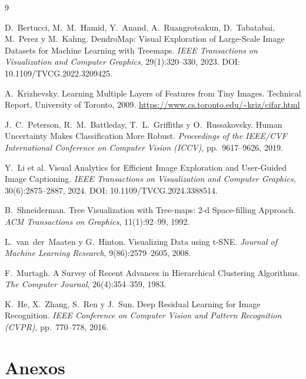 \documentclass[11pt,a4paper]{article}
\begin{document}
\begin{thebibliography}{9}

D.~Bertucci, M.~M.~Hamid, Y.~Anand, A.~Ruangrotsakun, D.~Tabatabai, M.~Perez y
M.~Kahng.
\newblock DendroMap: Visual Exploration of Large-Scale Image Datasets for
Machine Learning with Treemaps.
\newblock \emph{IEEE Transactions on Visualization and Computer Graphics},
29(1):320--330, 2023. DOI: 10.1109/TVCG.2022.3209425.

A.~Krizhevsky.
\newblock Learning Multiple Layers of Features from Tiny Images.
\newblock Technical Report, University of Toronto, 2009.
\newblock \url{https://www.cs.toronto.edu/~kriz/cifar.html}

J.~C.~Peterson, R.~M.~Battleday, T.~L.~Griffiths y O.~Russakovsky.
\newblock Human Uncertainty Makes Classification More Robust.
\newblock \emph{Proceedings of the IEEE/CVF International Conference on Computer
Vision (ICCV)}, pp.~9617--9626, 2019.

Y.~Li et al.
\newblock Visual Analytics for Efficient Image Exploration and User-Guided Image
Captioning.
\newblock \emph{IEEE Transactions on Visualization and Computer Graphics},
30(6):2875--2887, 2024. DOI: 10.1109/TVCG.2024.3388514.

B.~Shneiderman.
\newblock Tree Visualization with Tree-maps: 2-d Space-filling Approach.
\newblock \emph{ACM Transactions on Graphics}, 11(1):92--99, 1992.

L.~van~der~Maaten y G.~Hinton.
\newblock Visualizing Data using t-SNE.
\newblock \emph{Journal of Machine Learning Research}, 9(86):2579--2605, 2008.

F.~Murtagh.
\newblock A Survey of Recent Advances in Hierarchical Clustering Algorithms.
\newblock \emph{The Computer Journal}, 26(4):354--359, 1983.

K.~He, X.~Zhang, S.~Ren y J.~Sun.
\newblock Deep Residual Learning for Image Recognition.
\newblock \emph{IEEE Conference on Computer Vision and Pattern Recognition
(CVPR)}, pp.~770--778, 2016.

\end{thebibliography}

\section{Anexos}
\end{document}
